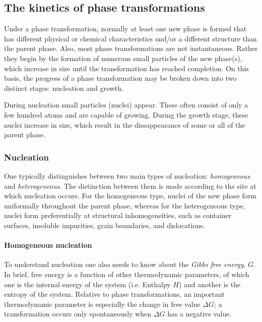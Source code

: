 
\subsection{The kinetics of phase transformations}
Under a phase transformation, normally at least one new phase is formed that has different physical or chemical characteristics and/or a different structure than the parent phase. Also, most phase transformations are not instantaneous. Rather they begin by the formation of numerous small particles of the new phase(s), which increase in size until the transformation has reached completion. On this basis, the progress of a phase transformation may be broken down into two distinct stages: nucleation and growth. 

During nucleation small particles (nuclei) appear. These often consist of only a few hundred atoms and are capable of growing. During the growth stage, these nuclei increase in size, which result in the dissappearance of some or all of the parent phase. 

\subsubsection{Nucleation}
One typically distinguishes between two main types of nucleation: \textit{homogeneous} and \textit{heterogeneous}. The distinction between them is made according to the site at which nucleation occurs. For the homogeneous type, nuclei of the new phase form uniformally throughout the parent phase, whereas for the heterogeneous type, nuclei form preferentially at structural inhomogeneities, such as container surfaces, insoluble impurities, grain boundaries, and dislocations.

\paragraph{Homogeneous nucleation} To understand nucleation one also needs to know about the \textit{Gibbs free energy}, $G$. In brief, free energy is a function of other thermodynamic parameters, of which one is the internal energy of the system (i.e. Enthalpy $H$) and another is the entropy of the system. Relative to phase transformations, an important thermodynamic parameter is especially the change in free value $\Delta G$; a transformation occurs only spontaneously when $\Delta G$ has a negative value.


